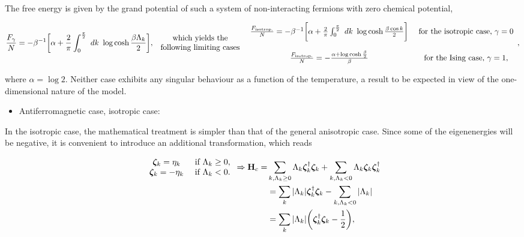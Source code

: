 \documentclass{homework}
\begin{document}
\blanky \\

The free energy is given by the grand potential of such a system of non-interacting fermions with zero chemical potential,

\begin{equation}
    \frac{F_{\gamma}}{N} = -\beta^{-1} \bigg[\alpha + \frac{2}{\pi} \int_{0}^{\frac{\pi}{2}}\ dk \textnormal{ } \log \cosh \frac{\beta \Lambda_k}{2} \bigg], \begin{array}{cc}
         \textnormal{ which yields the  }  \\
         \textnormal{ following limiting cases }
    \end{array} \begin{array}{cc}
      \frac{F_{\textnormal{isotrop.}}}{N} = -\beta^{-1} \bigg[\alpha + \frac{2}{\pi} \int_{0}^{\frac{\pi}{2}}\ dk \textnormal{ } \log \cosh \frac{\beta \cos k}{2} \bigg] & \textnormal{ for the isotropic case, } \gamma = 0\\ 
     \\
      \frac{F_{\textnormal{isotrop.}}}{N} = - \frac{\alpha + \log \cosh \frac{\beta}{2}}{\beta} & \textnormal{ for the Ising case, } \gamma = 1,
\end{array},
\end{equation}

where $\alpha = \log 2$. Neither case exhibits any singular behaviour as a function of the temperature, a result to be expected in view of the one-dimensional nature of the model. \\

\begin{itemize}
    \item Antiferromagnetic case, isotropic case:
\end{itemize}

In the isotropic case, the mathematical treatment is simpler than that of the general anisotropic case. Since some of the eigenenergies will be negative, it is convenient to introduce an additional transformation, which reads

\begin{equation} 
 \begin{split}
      \begin{array}{cc}
         \bm{\zeta}_k = \eta_k & \textnormal{ if } \Lambda_{k} \geq 0,\\
         \bm{\zeta}_k = -\eta_k & \textnormal{ if } \Lambda_{k} < 0.
    \end{array} \Rightarrow {\bf H}_c =& \sum_{k, \Lambda_k \geq 0} \Lambda_k \bm{\zeta}_k^\dagger \bm{\zeta}_k + \sum_{k, \Lambda_k < 0} \Lambda_k \bm{\zeta}_k\bm{\zeta}_k^\dagger \\
    &= \sum_{k} |\Lambda_k| \bm{\zeta}_k^\dagger \bm{\zeta}_k - \sum_{k, \Lambda_k < 0} |\Lambda_k| \\
    &= \sum_{k} |\Lambda_k| \bigg( \bm{\zeta}_k^\dagger \bm{\zeta}_k - \frac{1}{2} \bigg),
 \end{split}
\end{equation}
\end{document}
